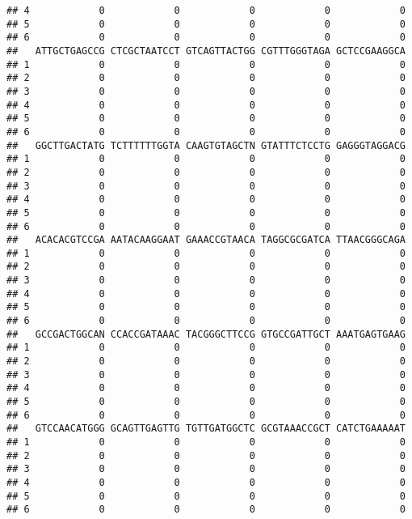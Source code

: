 \documentclass[]{article}
\begin{document}
\begin{verbatim}
## 4            0            0            0            0            0
## 5            0            0            0            0            0
## 6            0            0            0            0            0
##   ATTGCTGAGCCG CTCGCTAATCCT GTCAGTTACTGG CGTTTGGGTAGA GCTCCGAAGGCA
## 1            0            0            0            0            0
## 2            0            0            0            0            0
## 3            0            0            0            0            0
## 4            0            0            0            0            0
## 5            0            0            0            0            0
## 6            0            0            0            0            0
##   GGCTTGACTATG TCTTTTTTGGTA CAAGTGTAGCTN GTATTTCTCCTG GAGGGTAGGACG
## 1            0            0            0            0            0
## 2            0            0            0            0            0
## 3            0            0            0            0            0
## 4            0            0            0            0            0
## 5            0            0            0            0            0
## 6            0            0            0            0            0
##   ACACACGTCCGA AATACAAGGAAT GAAACCGTAACA TAGGCGCGATCA TTAACGGGCAGA
## 1            0            0            0            0            0
## 2            0            0            0            0            0
## 3            0            0            0            0            0
## 4            0            0            0            0            0
## 5            0            0            0            0            0
## 6            0            0            0            0            0
##   GCCGACTGGCAN CCACCGATAAAC TACGGGCTTCCG GTGCCGATTGCT AAATGAGTGAAG
## 1            0            0            0            0            0
## 2            0            0            0            0            0
## 3            0            0            0            0            0
## 4            0            0            0            0            0
## 5            0            0            0            0            0
## 6            0            0            0            0            0
##   GTCCAACATGGG GCAGTTGAGTTG TGTTGATGGCTC GCGTAAACCGCT CATCTGAAAAAT
## 1            0            0            0            0            0
## 2            0            0            0            0            0
## 3            0            0            0            0            0
## 4            0            0            0            0            0
## 5            0            0            0            0            0
## 6            0            0            0            0            0

\end{verbatim}
\end{document}
